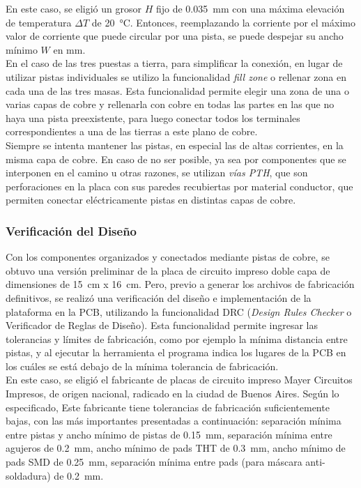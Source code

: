 En este caso, se eligió un grosor $H$ fijo de \SI[]{0.035}[]{\milli\metre} con una máxima elevación de temperatura $\Delta T$ de \SI[]{20}[]{\celsius}. Entonces, reemplazando la corriente por el máximo valor de corriente que puede circular por una pista, se puede despejar su ancho mínimo $W$ en \unit{\milli\metre}.\\

En el caso de las tres puestas a tierra, para simplificar la conexión, en lugar de utilizar pistas individuales se utilizo la funcionalidad \textit{fill zone} o rellenar zona en cada una de las tres masas. Esta funcionalidad permite elegir una zona de una o varias capas de cobre y rellenarla con cobre en todas las partes en las que no haya una pista preexistente, para luego conectar todos los terminales correspondientes a una de las tierras a este plano de cobre.\\

Siempre se intenta mantener las pistas, en especial las de altas corrientes, en la misma capa de cobre. En caso de no ser posible, ya sea por componentes que se interponen en el camino u otras razones, se utilizan \textit{vías PTH}, que son perforaciones en la placa con sus paredes recubiertas por material conductor, que permiten conectar eléctricamente pistas en distintas capas de cobre.\\

\subsubsection{Verificación del Diseño}
 
Con los componentes organizados y conectados mediante pistas de cobre, se obtuvo una versión preliminar de la placa de circuito impreso doble capa de dimensiones de \SI[]{15}[]{\centi\metre} x \SI[]{16}[]{\centi\metre}. Pero, previo a generar los archivos de fabricación definitivos, se realizó una verificación del diseño e implementación de la plataforma en la PCB, utilizando la funcionalidad DRC (\textit{Design Rules Checker} o Verificador de Reglas de Diseño). Esta funcionalidad permite ingresar las tolerancias y límites de fabricación, como por ejemplo la mínima distancia entre pistas, y al ejecutar la herramienta el programa indica los lugares de la PCB en los cuáles se está debajo de la mínima tolerancia de fabricación.\\

En este caso, se eligió el fabricante de placas de circuito impreso Mayer Circuitos Impresos, de origen nacional, radicado en la ciudad de Buenos Aires. Según lo especificado, Este fabricante tiene tolerancias de fabricación suficientemente bajas, con las más importantes presentadas a continuación: separación mínima entre pistas y ancho mínimo de pistas de \SI[]{0.15}[]{\milli\metre}, separación mínima entre agujeros de \SI[]{0.2}[]{\milli\metre}, ancho mínimo de pads THT de \SI[]{0.3}[]{\milli\metre}, ancho mínimo de pads SMD de \SI[]{0.25}[]{\milli\metre}, separación mínima entre pads (para máscara anti-soldadura) de \SI[]{0.2}[]{\milli\metre}.\\

